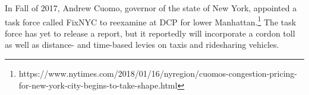In Fall of 2017, Andrew Cuomo, governor of the state of New York, appointed a task force called FixNYC to reexamine at DCP for lower Manhattan.\footnote{https://www.nytimes.com/2018/01/16/nyregion/cuomos-congestion-pricing-for-new-york-city-begins-to-take-shape.html} The task force has yet to release a report, but it reportedly will incorporate a cordon toll as well as distance- and time-based levies on taxis and ridesharing vehicles.




